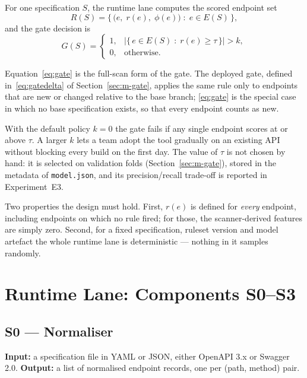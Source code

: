 \documentclass[conference]{IEEEtran}
\begin{document}
For one specification $S$, the runtime lane computes the scored endpoint set
\begin{equation}
R(S)=\bigl\{\,\bigl(e,\;r(e),\;\phi(e)\bigr)\;:\;e\in E(S)\,\bigr\},
\label{eq:scored}
\end{equation}
and the gate decision is
\begin{equation}
G(S)=
\begin{cases}
1, & \bigl|\{\,e\in E(S)\;:\;r(e)\ge\tau\,\}\bigr| > k,\\[2pt]
0, & \text{otherwise.}
\end{cases}
\label{eq:gate}
\end{equation}

Equation~\eqref{eq:gate} is the full-scan form of the gate. The deployed gate, defined
in~\eqref{eq:gatedelta} of Section~\ref{sec:m-gate}, applies the same rule only to endpoints
that are new or changed relative to the base branch; \eqref{eq:gate} is the special case in
which no base specification exists, so that every endpoint counts as new.

With the default policy $k=0$ the gate fails if any single endpoint scores at or above
$\tau$. A larger $k$ lets a team adopt the tool gradually on an existing API without
blocking every build on the first day. The value of $\tau$ is not chosen by hand: it is
selected on validation folds (Section~\ref{sec:m-gate}), stored in the metadata of
\texttt{model.json}, and its precision/recall trade-off is reported in Experiment~E3.

Two properties the design must hold. First, $r(e)$ is defined for \emph{every} endpoint,
including endpoints on which no rule fired; for those, the scanner-derived features are
simply zero. Second, for a fixed specification, ruleset version and model artefact the whole
runtime lane is deterministic --- nothing in it samples randomly.

\section{Runtime Lane: Components S0--S3}

\subsection{S0 --- Normaliser}
\textbf{Input:} a specification file in YAML or JSON, either OpenAPI 3.x or Swagger 2.0.
\textbf{Output:} a list of normalised endpoint records, one per (path, method) pair.
\end{document}
